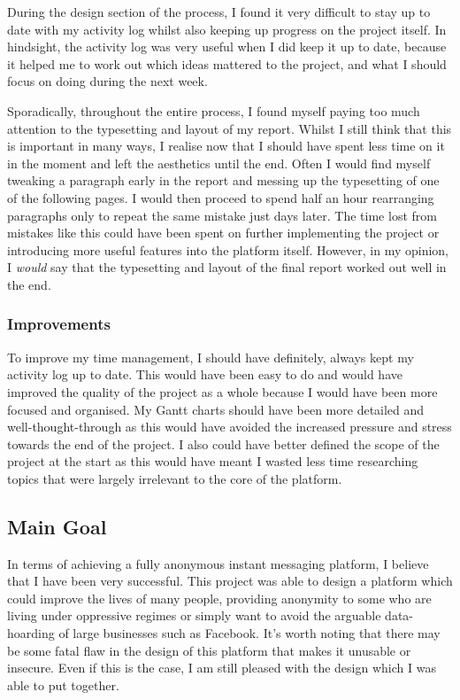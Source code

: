\documentclass{article}
\begin{document}
During the design section of the process, I found it very difficult to stay up to date with my activity log whilst also keeping up progress on the project itself. In hindsight, the activity log was very useful when I did keep it up to date, because it helped me to work out which ideas mattered to the project, and what I should focus on doing during the next week.

Sporadically, throughout the entire process, I found myself paying too much attention to the typesetting and layout of my report. Whilst I still think that this is important in many ways, I realise now that I should have spent less time on it in the moment and left the aesthetics until the end. Often I would find myself tweaking a paragraph early in the report and messing up the typesetting of one of the following pages. I would then proceed to spend half an hour rearranging paragraphs only to repeat the same mistake just days later. The time lost from mistakes like this could have been spent on further implementing the project or introducing more useful features into the platform itself. However, in my opinion, I \textit{would} say that the typesetting and layout of the final report worked out well in the end.

\subsubsection{Improvements}
To improve my time management, I should have definitely, always kept my activity log up to date. This would have been easy to do and would have improved the quality of the project as a whole because I would have been more focused and organised. My Gantt charts should have been more detailed and well-thought-through as this would have avoided the increased pressure and stress towards the end of the project. I also could have better defined the scope of the project at the start as this would have meant I wasted less time researching topics that were largely irrelevant to the core of the platform.

\subsection{Main Goal}
In terms of achieving a fully anonymous instant messaging platform, I believe that I have been very successful. This project was able to design a platform which could improve the lives of many people, providing anonymity to some who are living under oppressive regimes or simply want to avoid the arguable data-hoarding of large businesses such as Facebook. It's worth noting that there may be some fatal flaw in the design of this platform that makes it unusable or insecure. Even if this is the case, I am still pleased with the design which I was able to put together.
\end{document}
